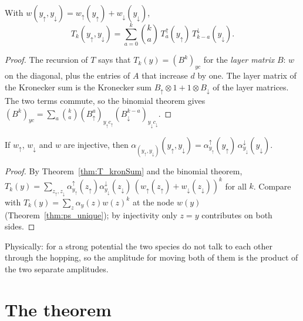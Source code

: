 \begin{theorem}
  \label{thm:T_kronSum}
  \leanok
  With $w(y_\uparrow,y_\downarrow)=w_\uparrow(y_\uparrow)+w_\downarrow(y_\downarrow)$,
  \[
    T_k(y_\uparrow,y_\downarrow)=\sum_{a=0}^k\binom ka\,T^\uparrow_a(y_\uparrow)\,T^\downarrow_{k-a}(y_\downarrow).
  \]
\end{theorem}
\begin{proof}
  \leanok
  The recursion of $T$ says that $T_k(y)=(B^k)_{yc}$ for the \emph{layer matrix} $B$: $w$ on the
  diagonal, plus the entries of $A$ that increase $d$ by one. The layer matrix of the Kronecker sum is the
  Kronecker sum $B_\uparrow\otimes1+1\otimes B_\downarrow$ of the layer matrices. The two terms commute,
  so the binomial theorem gives
  $(B^k)_{yc}=\sum_a\binom ka(B_\uparrow^a)_{y_\uparrow c_\uparrow}(B_\downarrow^{k-a})_{y_\downarrow c_\downarrow}$.
\end{proof}

\begin{theorem}
  \label{thm:alpha_kronSum}
  \leanok
  If $w_\uparrow$, $w_\downarrow$ and $w$ are injective, then
  $\alpha_{(y_\uparrow,y_\downarrow)}(y_\uparrow,y_\downarrow)=\alpha^\uparrow_{y_\uparrow}(y_\uparrow)\,
  \alpha^\downarrow_{y_\downarrow}(y_\downarrow)$.
\end{theorem}
\begin{proof}
  \leanok
  By Theorem~\ref{thm:T_kronSum} and the binomial theorem,
  $T_k(y)=\sum_{z_\uparrow,z_\downarrow}\alpha^\uparrow_{y_\uparrow}(z_\uparrow)\alpha^\downarrow_{y_\downarrow}(z_\downarrow)
  \,(w_\uparrow(z_\uparrow)+w_\downarrow(z_\downarrow))^k$ for all $k$. Compare with
  $T_k(y)=\sum_z\alpha_y(z)w(z)^k$ at the node $w(y)$ (Theorem~\ref{thm:ps_unique}); by injectivity only
  $z=y$ contributes on both sides.
\end{proof}

Physically: for a strong potential the two species do not talk to each other through the hopping, so the
amplitude for moving both of them is the product of the two separate amplitudes.

\section{The theorem}

